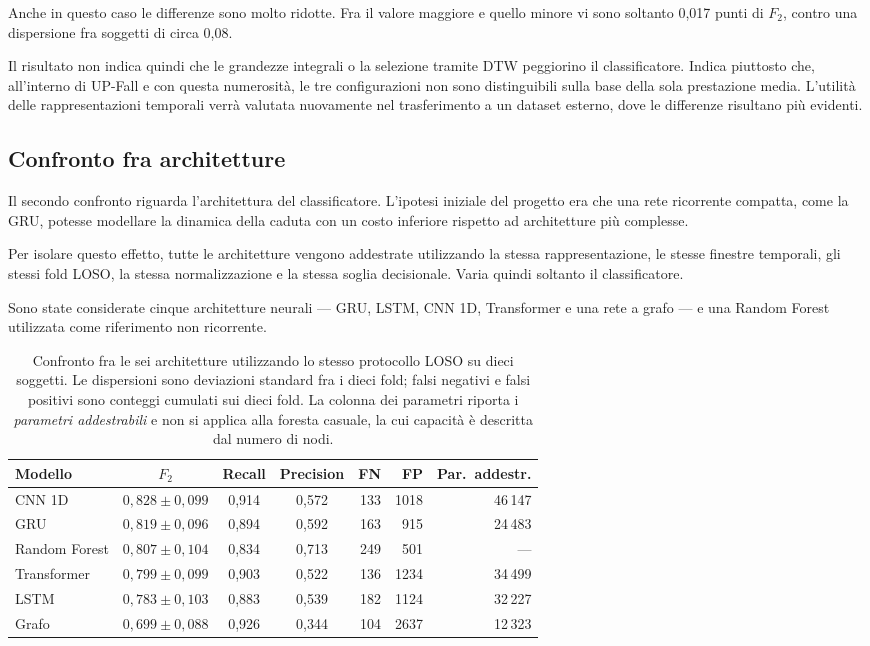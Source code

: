 Anche in questo caso le differenze sono molto ridotte. Fra il valore maggiore e quello minore vi sono soltanto 0,017 punti di $F_2$, contro una dispersione fra soggetti di circa 0,08.

Il risultato non indica quindi che le grandezze integrali o la selezione tramite DTW peggiorino il classificatore. Indica piuttosto che, all'interno di UP-Fall e con questa numerosità, le tre configurazioni non sono distinguibili sulla base della sola prestazione media. L'utilità delle rappresentazioni temporali verrà valutata nuovamente nel trasferimento a un dataset esterno, dove le differenze risultano più evidenti.

\subsection{Confronto fra architetture}
\label{sec:architetture}

Il secondo confronto riguarda l'architettura del classificatore. L'ipotesi iniziale del progetto era che una rete ricorrente compatta, come la GRU, potesse modellare la dinamica della caduta con un costo inferiore rispetto ad architetture più complesse.

Per isolare questo effetto, tutte le architetture vengono addestrate utilizzando la stessa rappresentazione, le stesse finestre temporali, gli stessi fold LOSO, la stessa normalizzazione e la stessa soglia decisionale. Varia quindi soltanto il classificatore.

Sono state considerate cinque architetture neurali --- GRU, LSTM, CNN 1D, Transformer e una rete a grafo --- e una Random Forest utilizzata come riferimento non ricorrente.

\begin{table}[ht]
\centering
\caption{Confronto fra le sei architetture utilizzando lo stesso protocollo
LOSO su dieci soggetti. Le dispersioni sono deviazioni standard fra i dieci
fold; falsi negativi e falsi positivi sono conteggi cumulati sui dieci fold.
La colonna dei parametri riporta i \emph{parametri addestrabili} e non si
applica alla foresta casuale, la cui capacità è descritta dal numero di nodi.}
\label{tab:architetture}
\begin{tabular}{lcccrrr}
\toprule
\textbf{Modello} & \textbf{$F_2$} & \textbf{Recall} & \textbf{Precision} &
\textbf{FN} & \textbf{FP} & \textbf{Par.\ addestr.} \\
\midrule
CNN 1D & $0{,}828 \pm 0{,}099$ & 0,914 & 0,572 & 133 & 1018 & 46\,147 \\
GRU & $0{,}819 \pm 0{,}096$ & 0,894 & 0,592 & 163 & 915 & 24\,483 \\
Random Forest & $0{,}807 \pm 0{,}104$ & 0,834 & 0,713 & 249 & 501 & --- \\
Transformer & $0{,}799 \pm 0{,}099$ & 0,903 & 0,522 & 136 & 1234 & 34\,499 \\
LSTM & $0{,}783 \pm 0{,}103$ & 0,883 & 0,539 & 182 & 1124 & 32\,227 \\
Grafo & $0{,}699 \pm 0{,}088$ & 0,926 & 0,344 & 104 & 2637 & 12\,323 \\
\bottomrule
\end{tabular}
\end{table}

